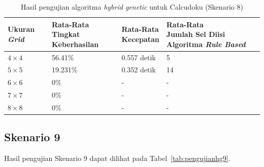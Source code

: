 \begin{table}
\centering
\captionsetup{justification=centering}
\caption[Hasil pengujian algoritma \textit{hybrid genetic} untuk Calcudoku (Skenario 8)]{Hasil pengujian algoritma \textit{hybrid genetic} untuk Calcudoku (Skenario 8)}
\begin{tabular}{| l | l | l | l |}
\hline
Ukuran \textit{Grid} & \makecell[c]{Rata-Rata \\ Tingkat Keberhasilan} & \makecell[c]{Rata-Rata \\ Kecepatan} & \makecell[c]{Rata-Rata \\ Jumlah Sel Diisi Algoritma \textit{Rule Based}} \\
\hline \hline
\begin{math}4 \times 4\end{math} & 56.41\% & 0.557 detik & 5 \\
\hline
\begin{math}5 \times 5\end{math} & 19.231\% & 0.352 detik & 14 \\
\hline
\begin{math}6 \times 6\end{math} & 0\% & - & - \\
\hline
\begin{math}7 \times 7\end{math} & 0\% & - & - \\
\hline
\begin{math}8 \times 8\end{math} & 0\% & - & - \\
\hline
\end{tabular}
\label{tab:pengujianhg8}
\end{table}

\subsection{Skenario 9}
\label{sec:skenario9}

Hasil pengujian Skenario 9 dapat dilihat pada Tabel~\ref{tab:pengujianhg9}.

